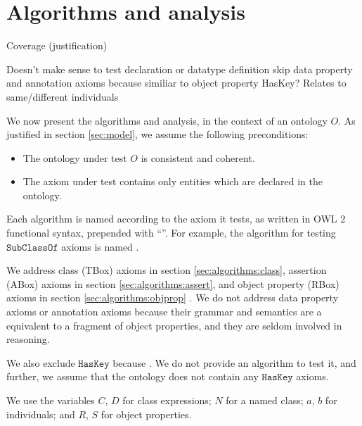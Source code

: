 \documentclass[paper.tex]{subfiles}
\begin{document}
\section{Algorithms and analysis}
\label{sec:algorithms}

\begin{todos}
  \todo Coverage (justification)
  \begin{todos}
    \todo Doesn't make sense to test declaration or data\-type definition
    \todo skip data property and annotation axioms because similiar to object property
    \todo HasKey?  Relates to same/different individuals
  \end{todos}
\end{todos}

We now present the algorithms and analysis, in the context of an ontology $O$.  As justified in section \ref{sec:model}, we assume the following preconditions:
\begin{itemize}[nosep]
  \item The ontology under test $O$ is consistent and coherent.
  \item The axiom under test contains only entities which are declared in the ontology.
\end{itemize}

Each algorithm is named according to the axiom it tests, as written in OWL 2 functional syntax, prepended with ``''.  For example, the algorithm for testing $\mathtt{SubClassOf}$ axioms is named .

We address class (TBox) axioms in section \ref{sec:algorithms:class}, assertion (ABox) axioms in section \ref{sec:algorithms:assert}, and object property (RBox) axioms in section \ref{sec:algorithms:objprop} \todo[TBC].  We do not address data property axioms or annotation axioms because their grammar and semantics are a equivalent to a fragment of object properties, and they are seldom involved in reasoning.

We also exclude $\mathtt{HasKey}$ because  \todo[cite].  We do not provide an algorithm to test it, and further, we assume that the ontology does not contain any $\mathtt{HasKey}$ axioms.

We use the variables $C$, $D$ for class expressions; $N$ for a named class; $a$, $b$ for individuals; and $R$, $S$ for object properties.
\end{document}
